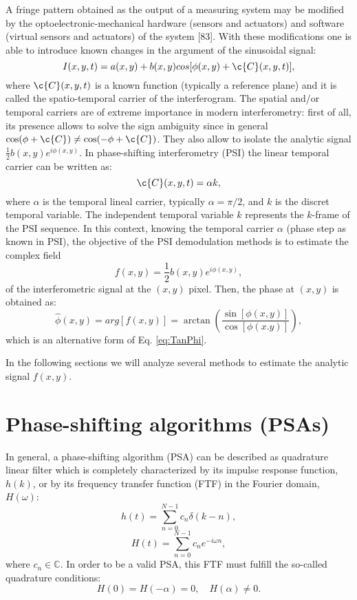 A fringe pattern obtained as the output of a measuring system may be modified
by the optoelectronic-mechanical hardware (sensors and actuators) and software
(virtual sensors and actuators) of the system [83]. With these modifications one
is able to introduce known changes in the argument of the sinusoidal signal:
\begin{equation}\label{eq:FringePatternTemporal}
 I(x,y,t)=a(x,y)+b(x,y)cos[\phi(x,y) + \c{C}(x,y,t)],
\end{equation}
where $\c{C}(x,y,t)$ is a known function (typically a reference plane) and it is 
called the spatio-temporal carrier of the interferogram. The spatial and/or 
temporal carriers are of extreme importance in modern interferometry: first of 
all, its presence allows to solve the sign ambiguity since in general 
$\cos(\phi+\c{C})\not=\cos(-\phi+\c{C})$. They also allow to isolate the analytic signal
$\frac{1}{2} b(x,y)e^{i \phi(x,y)}$. In phase-shifting interferometry (PSI) the
linear temporal carrier can be written as:
\begin{equation}\label{PSIcarrier}
 \c{C}(x,y,t)=\alpha k,
\end{equation}
where $\alpha$ is the temporal lineal carrier, typically $\alpha=\pi/2$, and $k$
is the discret temporal variable. The independent temporal variable $k$ represents
the $k$-frame of the PSI sequence. In this context, knowing the temporal carrier 
$\alpha$ (phase step as known in PSI), the objective of the PSI demodulation 
methods is to estimate the complex field
\begin{equation}\label{eq:Complexfield}
 f(x,y)=\frac{1}{2}b(x,y)e^{i\phi(x,y)},
\end{equation}
of the interferometric signal at the $(x,y)$ pixel. Then, the phase at $(x,y)$ 
is obtained as:
\begin{equation}\label{eq:PSIphase}
  \hat{\phi}(x,y)=arg[f(x,y)]=\arctan\left(\frac{\sin[\phi(x,y)]}{\cos[\phi(x.y)]}
\right),
\end{equation}
which is an alternative form of Eq. \eqref{eq:TanPhi}.

In the following sections we will analyze several methods to estimate the 
analytic signal $f(x,y)$.

\section{Phase-shifting algorithms (PSAs)}

In general, a phase-shifting algorithm (PSA) can be described as quadrature linear
filter which is completely characterized by its impulse response function, $h(k)$,
or by its frequency transfer function (FTF) in the Fourier domain, $H(\omega)$:
\begin{equation}
 h(t)=\sum^{N-1}_{n=0} c_n \delta(k-n),
\end{equation}
\begin{equation}
 H(t)=\sum^{N-1}_{n=0} c_n e^{-i\omega n},
\end{equation}
where ${c_n} \in \mathbb{C}$. In order to be a valid PSA, this FTF must fulfill
the so-called quadrature conditions:
\begin{equation}
 H(0)=H(-\alpha)=0, \quad H(\alpha)\not=0.
\end{equation}

